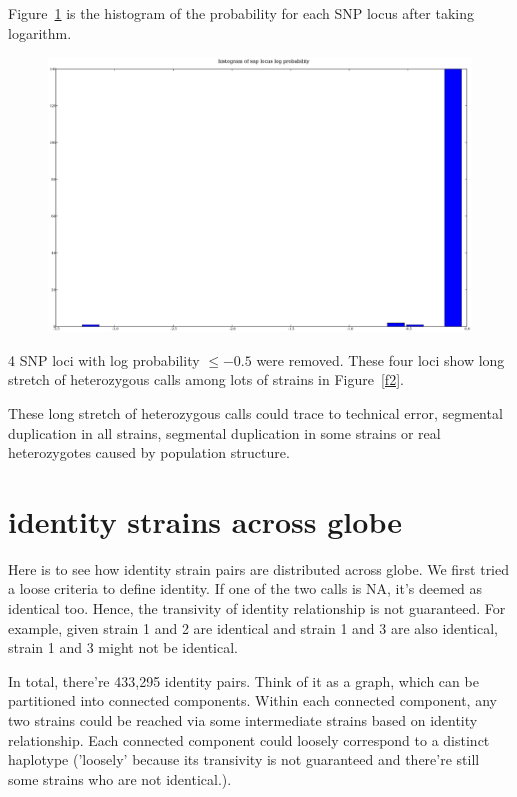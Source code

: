 \documentclass[a4paper,10pt]{article}
\begin{document}
Figure~\ref{f3} is the histogram of the probability for each SNP locus after taking logarithm.

\begin{figure}
\includegraphics[width=1\textwidth]{figures/data_d110_c0_5_SNP_locus_log_prob.eps}
\caption{}\label{f3}
\end{figure}

4 SNP loci with log probability $\leq -0.5$ were removed. These four loci show long stretch of heterozygous calls among lots of strains in Figure~\ref{f2}. 

These long stretch of heterozygous calls could trace to technical error, segmental duplication in all strains, segmental duplication in some strains  or real heterozygotes caused by population structure.


\section{identity strains across globe}
Here is to see how identity strain pairs are distributed across globe. We first tried a loose criteria to define identity. If one of the two calls is NA, it's deemed as identical too. Hence, the transivity of identity relationship is not guaranteed. For example, given strain 1 and 2 are identical and strain 1 and 3 are also identical, strain 1 and 3 might not be identical.

In total, there're 433,295 identity pairs. Think of it as a graph, which can be partitioned into connected components. Within each connected component, any two strains could be reached via some intermediate strains based on identity relationship. Each connected component could loosely correspond to a distinct haplotype ('loosely' because its transivity is not guaranteed and there're still some strains who are not identical.).
\end{document}
